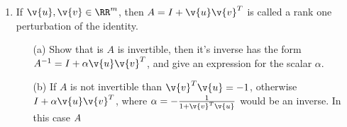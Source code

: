 \documentclass[11pt]{article}
\begin{document}
\begin{enumerate}
\begin{enumerate}
                \begin{proof}
                    Let $\lambda_x$ and $\lambda_y$ be the eigenvalues corresponding
                    to $\v{x}$ and $\v{y}$ respectively, that is
                    $A\v{x} = \lambda_x\v{x}$, $A\v{y} = \lambda_y\v{y}$, and
                    $\lambda_x \neq \lambda_y$.
                    Since $A$ is Hermitian, we have just shown that
                    $\lambda_x, \lambda_y \in \RR$.
                    Also because $A$ is Hermitian
                    \begin{align*}
                        A &= A^* \\
                        \v{x}^* A &= \v{x}^* A^* \\
                        \v{x}^* A &= \p{A\v{x}}^*.
                        \intertext{Since $\v{x}$ is an eigenvector}
                        \v{x}^* A &= \p{\lambda_x \v{x}}^*
                        \intertext{Since $\lambda_x \in \RR$}
                        \v{x}^* A &= \lambda_x \v{x}^* \\
                        \v{x}^* A \v{y} &= \lambda_x \v{x}^* \v{y} \\
                        \v{x}^* \lambda_y \v{y} &= \lambda_x \v{x}^* \v{y} \\
                        \p{\lambda_y - \lambda_x} \v{x}^* \v{y} &= 0
                        \intertext{Since $\lambda_x \neq \lambda_y$, $\lambda_y - \lambda_x \neq 0$.}
                        \v{x}^* \v{y} &= 0
                    \end{align*}
                    Therefore $\v{x}$ and $\v{y}$ are orthogonal.
                \end{proof}

        \end{enumerate}

    \item %
        If $\v{u}, \v{v} \in \RR^m$, then $A = I + \v{u}\v{v}^T$ is called a
        rank one perturbation of the identity.
        \begin{enumerate}
            \item[(a)]
                Show that is $A$ is invertible, then it's inverse has the form
                $A^{-1} = I + \alpha \v{u}\v{v}^T$, and give an expression for
                the scalar $\alpha$.



            \item[(b)]
                If $A$ is not invertible than $\v{v}^T \v{u} = -1$, otherwise
                $I + \alpha \v{u}\v{v}^T$, where
                $\alpha = -\frac{1}{1 + \v{v}^T\v{u}}$ would be an inverse.
                In this case $\null{A}$
        \end{enumerate}


\end{enumerate}
\end{document}
